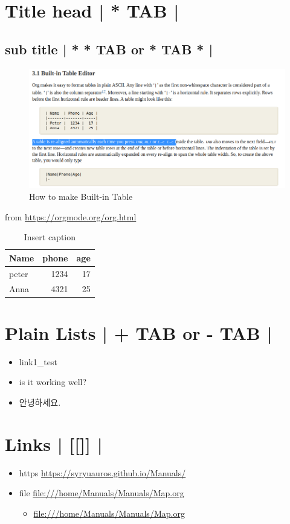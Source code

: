 \documentclass[11pt]{article}
\author{JJ Kim}
\date{\today}
\title{}
\begin{document}
\tableofcontents

\section{Title head  | *  TAB |}
\label{sec:orgc020be1}
\subsection{sub title | * * TAB or * TAB * |}
\label{sec:org6c1c21f}
 \begin{figure}[htbp]
\centering
\includegraphics[width=.9\linewidth]{./img/samples/samples1.png}
\caption{\label{fig:a-1}How to make Built-in Table}
\end{figure}
from \url{https://orgmode.org/org.html}

\begin{table}[htbp]
\caption{\label{table: 1}Insert caption}
\centering
\begin{tabular}{lrr}
Name & phone & age\\
\hline
peter & 1234 & 17\\
Anna & 4321 & 25\\
\end{tabular}
\end{table}



\section{Plain Lists | + TAB or - TAB |}
\label{sec:orgd6f5b4b}
\begin{itemize}
\item link1\_test
\item is it working well?
\item 안녕하세요.
\end{itemize}


\section{Links | [[]] |}
\label{sec:org7947809}
\begin{itemize}
\item https    \url{https://syryuauros.github.io/Manuals/}
\item file       \url{file:///home/Manuals/Manuals/Map.org}
\begin{itemize}
\item \url{file:///home/Manuals/Manuals/Map.org}
\end{itemize}
\end{itemize}
\end{document}
